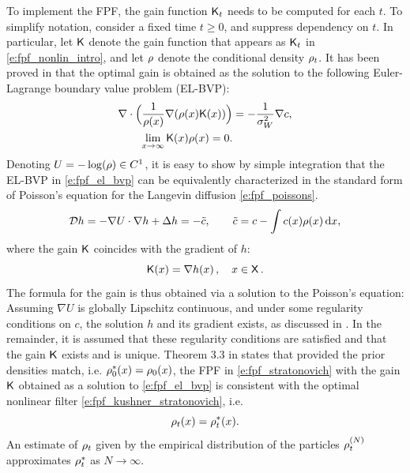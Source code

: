 To implement the FPF, the gain function $\text{\sf K}_t$ needs to be computed for each $t$. To simplify notation, consider a fixed time $t\ge 0$,  and suppress dependency on $t$.  In particular, let $\text{\sf K}$ denote the gain function that appears as  $ \text{\sf K}_t$  in \eqref{e:fpf_nonlin_intro},  and let $\rho$ denote the conditional density $\rho_t$. It has been proved in \cite{yanmehmey13} that the optimal gain is obtained as the solution to the following Euler-Lagrange boundary value problem (EL-BVP):
\begin{equation}
\begin{aligned}
\nabla \cdot \Bigl(\frac{1}{\pr(x)} \nabla (\pr(x) \kFPF(x))\Bigr) &= - \frac{1}{\sigma^2_W} \nabla c, \\
\lim_{x \to \infty} \kFPF(x) \pr(x) = 0.
\label{e:fpf_el_bvp}
\end{aligned}
\end{equation}%
Denoting $U=-\log(\rho)\in C^1$, it is easy to show by simple integration that the EL-BVP in \eqref{e:fpf_el_bvp} can be equivalently characterized in the standard form of Poisson's equation for the Langevin diffusion \eqref{e:fpf_poissons}.
\begin{equation}
\generate h = -\nabla \pot \cdot \nabla h + \Delta h  = -\tilc, \qquad \tilc = c - \int c(x) \pr(x)\, \ud x, 
\label{e:fpf_poissons}
\end{equation}
where the gain $\text{\sf K}$ coincides with the gradient of $h$:
\begin{equation}
\kFPF (x) = \nabla h(x)\, ,  \quad x\in\state\, .
\label{e:fpf_k_gradient}
\end{equation}
The formula for the gain is thus obtained via a solution to the Poisson's equation:
Assuming $\nabla U$ is globally Lipschitz continuous, and under some regularity conditions on $c$, the solution $h$ and its gradient exists, as discussed in . In the remainder, it is assumed that these regularity conditions are satisfied and that the gain $\text{\sf K}$ exists and is unique. Theorem 3.3 in \cite{yanmehmey13} states that provided the prior densities match, i.e. $\rho^*_0(x) = \rho_0(x)$, the FPF in \eqref{e:fpf_stratonovich} with the gain $\text{\sf K}$ obtained as a solution to \eqref{e:fpf_el_bvp} is consistent with the optimal nonlinear filter \eqref{e:fpf_kushner_stratonovich}, i.e.
\begin{equation}
\rho_t(x) = \rho^*_t(x). 
\end{equation}
An estimate of $\rho_t$ given by the empirical distribution of the particles $\rho^{(N)}_t$ approximates $\rho^*_t$ as $N \to \infty$. 
